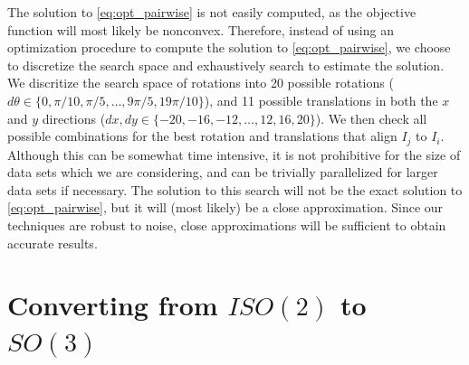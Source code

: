 \documentclass[11pt]{article}
\begin{document}
The solution to \eqref{eq:opt_pairwise} is not easily computed, as the objective function will most likely be nonconvex.
%
Therefore, instead of using an optimization procedure to compute the solution to \eqref{eq:opt_pairwise}, we choose to discretize the search space and exhaustively search to estimate the solution.
%
We discritize the search space of rotations into 20 possible rotations ($d\theta  \in \{0, \pi/10, \pi/5, \dots, 9 \pi/5, 19\pi/10 \}$), and 11 possible translations in both the $x$ and $y$ directions ($dx, dy \in \{-20, -16, -12, \dots, 12, 16, 20 \}$). 
%
We then check all possible combinations for the best rotation and translations that align $I_j$ to $I_i$. 
%
Although this can be somewhat time intensive, it is not prohibitive for the size of data sets which we are considering, and can be trivially parallelized for larger data sets if necessary.
%
The solution to this search will not be the exact solution to \eqref{eq:opt_pairwise}, but it will (most likely) be a close approximation.
%
Since our techniques are robust to noise, close approximations will be sufficient to obtain accurate results.

\section{Converting from $ISO(2)$ to $SO(3)$}
\end{document}
